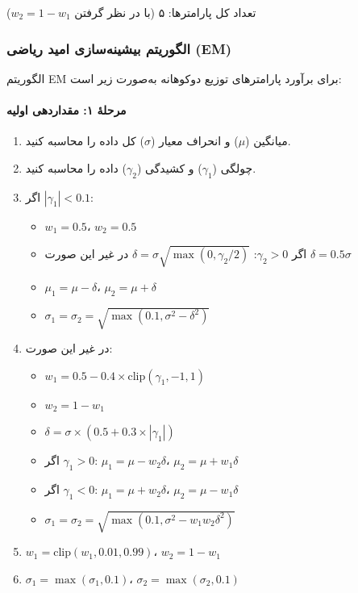 \documentclass[a4paper,12pt]{article}
\begin{document}
تعداد کل پارامترها: ۵ (با در نظر گرفتن $w_2 = 1 - w_1$)

\subsubsection{الگوریتم بیشینه‌سازی امید ریاضی (EM)}

الگوریتم EM برای برآورد پارامترهای توزیع دوکوهانه به‌صورت زیر است:

\paragraph{مرحلهٔ ۱: مقداردهی اولیه}

\begin{enumerate}
\item میانگین ($\mu$) و انحراف معیار ($\sigma$) کل داده را محاسبه کنید.
\item چولگی ($\gamma_1$) و کشیدگی ($\gamma_2$) داده را محاسبه کنید.
\item اگر $|\gamma_1| < 0.1$:
  \begin{itemize}
  \item $w_1 = 0.5$، $w_2 = 0.5$
  \item اگر $\gamma_2 > 0$: $\delta = \sigma \sqrt{\max(0, \gamma_2/2)}$ در غیر این صورت $\delta = 0.5\sigma$
  \item $\mu_1 = \mu - \delta$، $\mu_2 = \mu + \delta$
  \item $\sigma_1 = \sigma_2 = \sqrt{\max(0.1, \sigma^2 - \delta^2)}$
  \end{itemize}
\item در غیر این صورت:
  \begin{itemize}
  \item $w_1 = 0.5 - 0.4 \times \text{clip}(\gamma_1, -1, 1)$
  \item $w_2 = 1 - w_1$
  \item $\delta = \sigma \times (0.5 + 0.3 \times |\gamma_1|)$
  \item اگر $\gamma_1 > 0$: $\mu_1 = \mu - w_2\delta$، $\mu_2 = \mu + w_1\delta$
  \item اگر $\gamma_1 < 0$: $\mu_1 = \mu + w_2\delta$، $\mu_2 = \mu - w_1\delta$
  \item $\sigma_1 = \sigma_2 = \sqrt{\max(0.1, \sigma^2 - w_1 w_2 \delta^2)}$
  \end{itemize}
\item $w_1 = \text{clip}(w_1, 0.01, 0.99)$، $w_2 = 1 - w_1$
\item $\sigma_1 = \max(\sigma_1, 0.1)$، $\sigma_2 = \max(\sigma_2, 0.1)$
\end{enumerate}
\end{document}
